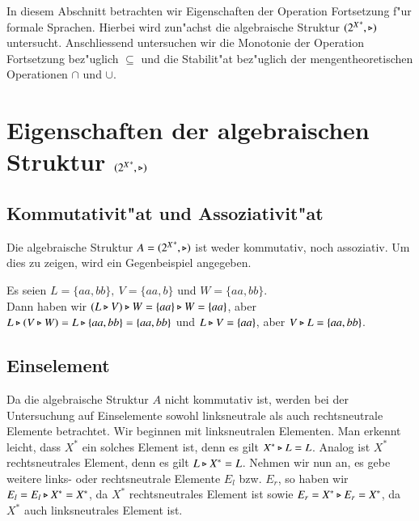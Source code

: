 In diesem Abschnitt betrachten wir Eigenschaften der Operation Fortsetzung f"ur formale Sprachen.
Hierbei wird zun"achst die algebraische Struktur $({2^X}^*,\triangleright)$ untersucht. Anschliessend untersuchen wir die Monotonie der Operation Fortsetzung bez"uglich $\subseteq$ und die Stabilit"at bez"uglich der mengentheoretischen Operationen $\cap$ und $\cup$.

\section{Eigenschaften der algebraischen Struktur $({2^X}^*,\triangleright)$}

\subsection{Kommutativit"at und Assoziativit"at}
Die algebraische Struktur $A=({2^X}^*,\triangleright)$ ist weder kommutativ, noch assoziativ. Um dies zu zeigen, wird ein Gegenbeispiel angegeben.

\vspace{2ex}

\begin{beispiel}
Es seien $L=\{aa,bb\},\ V = \{aa,b\}$ und $W=\{aa,bb\}$. \\Dann haben wir $(L\triangleright V)\triangleright W = \{aa\} \triangleright W = \{aa\}$, aber $L\triangleright (V\triangleright W) = L\triangleright \{aa,bb\} = \{aa,bb\}$ und $L\triangleright V = \{aa\}$, aber $V\triangleright L=\{aa,bb\}$.
\end{beispiel}

\subsection{Einselement}

Da die algebraische Struktur $A$ nicht kommutativ ist, werden bei der Untersuchung auf Einselemente sowohl linksneutrale als auch rechtsneutrale Elemente betrachtet.
Wir beginnen mit linksneutralen Elementen.
Man erkennt leicht, dass $X^*$ ein solches Element ist, denn es gilt $X^*\triangleright L = L$.
Analog ist $X^*$ rechtsneutrales Element, denn es gilt $L\triangleright X^* = L$.
Nehmen wir nun an, es gebe weitere links- oder rechtsneutrale Elemente $E_l$ bzw. $E_r$, so haben wir $E_l=E_l\triangleright X^* = X^*$, da $X^*$ rechtsneutrales Element ist sowie $E_r = X^*\triangleright E_r = X^*$, da $X^*$ auch linksneutrales Element ist.

